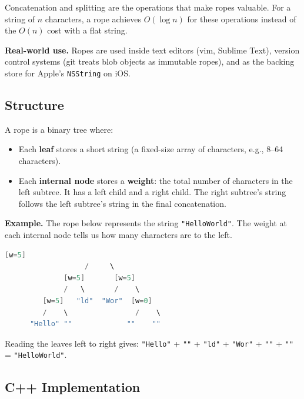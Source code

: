 Concatenation and splitting are the operations that make ropes valuable. For a string of $n$ characters, a rope achieves $O(\log n)$ for these operations instead of the $O(n)$ cost with a flat string.

\textbf{Real-world use.} Ropes are used inside text editors (vim, Sublime Text), version control systems (git treats blob objects as immutable ropes), and as the backing store for Apple's \texttt{NSString} on iOS.

\subsection{Structure}

A rope is a binary tree where:

\begin{itemize}
\item Each \textbf{leaf} stores a short string (a fixed-size array of characters, e.g., 8--64 characters).
\item Each \textbf{internal node} stores a \textbf{weight}: the total number of characters in the left subtree. It has a left child and a right child. The right subtree's string follows the left subtree's string in the final concatenation.
\end{itemize}

\textbf{Example.} The rope below represents the string \texttt{"HelloWorld"}. The weight at each internal node tells us how many characters are to the left.

\begin{lstlisting}[language=Java]
                    [w=5]
                   /     \
              [w=5]       [w=5]
              /   \       /    \
         [w=5]   "ld"  "Wor"  [w=0]
         /    \                /    \
      "Hello" ""             ""    ""
\end{lstlisting}

Reading the leaves left to right gives: \texttt{"Hello"} + \texttt{""} + \texttt{"ld"} + \texttt{"Wor"} + \texttt{""} + \texttt{""} = \texttt{"HelloWorld"}.

\subsection{C++ Implementation}

